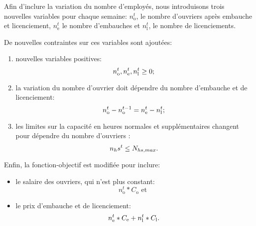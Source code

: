 Afin d'inclure la variation du nombre d'employés, nous introduisons trois nouvelles variables pour chaque semaine: $n_\text{o}^t$, le nombre d'ouvriers après embauche et licenciement, $n_\text{e}^t$ le nombre d'embauches et $n_\text{l}^t$, le nombre de licenciements.

De nouvelles contraintes sur ces variables sont ajoutées:
\begin{enumerate}
    \item nouvelles variables positives:
    \[
        n_\text{o}^t, n_\text{e}^t, n_\text{l}^t \geq 0
        \text;
    \]
    
    \item la variation du nombre d'ouvrier doit dépendre du nombre d'embauche et de licenciement:
    \[
        n_\text{o}^t - n_\text{o}^{t-1} = n_\text{e}^t - n_\text{l}^t
        \text;
    \]
    
    \item les limites sur la capacité en heures normales et supplémentaires changent pour dépendre du nombre d'ouvriers :
    \[
        n_hs^t \leq N_{hs,max}
        \text.
    \]
\end{enumerate}

Enfin, la fonction-objectif est modifiée pour inclure:
\begin{itemize}
    \item le salaire des ouvriers, qui n'est plus constant:
    \[
        n_\text{o}^t*C_\text{o}
        \text{ et }
    \]
    
    \item le prix d'embauche et de licenciement:
    \[
        n_\text{e}^t*C_\text{e} + n_\text{l}^t*C_\text{l}
        \text.
    \]
\end{itemize}
